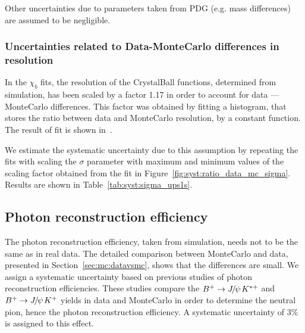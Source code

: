 Other uncertainties due to parameters taken from PDG (e.g. mass differences)
are assumed to be negligible.
 
\subsubsection{Uncertainties related to Data-MonteCarlo differences in resolution}
 
In the $\chi_b$ fits, the resolution of the CrystalBall functions, determined
from simulation, has been scaled by a factor 1.17 in order to account for data
--- MonteCarlo differences. This factor was obtained by fitting a histogram,
that stores the ratio between data and MonteCarlo resolution, by a constant
function. The result of fit is shown in~.
 
% 


We estimate the systematic uncertainty due to this assumption by repeating the
fits with scaling the $\sigma$ parameter with maximum and minimum values of
the scaling factor obtained from the fit in Figure~\ref{fig:syst:ratio_data_mc_sigma}.
Results are shown in Table~\ref{tab:syst:sigma_ups1s}.






\subsection{Photon reconstruction efficiency}
The photon reconstruction efficiency, taken from simulation, needs not to be
the same as in real data. The detailed comparison between MonteCarlo and data,
presented in Section~\ref{sec:mc:datavsmc}, shows that the differences
are small. We assign a systematic uncertainty based on previous studies of
photon reconstruction efficiencies. These studies compare the
$B^+ \rightarrow {\ensuremath{{J\mskip -3mu/\mskip -2mu\psi\mskip 2mu}}} K^{*+}$ and $B^+ \rightarrow {\ensuremath{{J\mskip -3mu/\mskip -2mu\psi\mskip 2mu}}} K^+$ yields in data and MonteCarlo in
order to determine the neutral pion, hence the photon  reconstruction
efficiency. A systematic uncertainty of 3\% is assigned to this effect.


